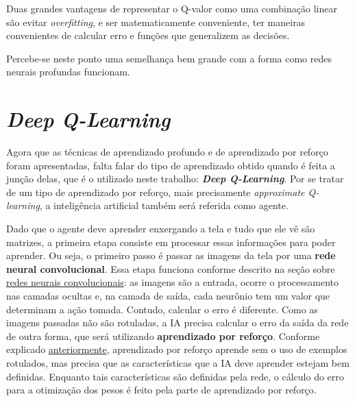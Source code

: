 Duas grandes vantagens de representar o Q-valor como uma combinação linear são evitar \textit{overfitting}, e ser matematicamente conveniente, ter maneiras convenientes de calcular erro e funções que generalizem as decisões.

Percebe-se neste ponto uma semelhança bem grande com a forma como redes neurais profundas funcionam.


\section{\textit{Deep Q-Learning}}
\label{sec:dql}

Agora que as técnicas de aprendizado profundo e de aprendizado por reforço foram apresentadas, falta falar do tipo de aprendizado obtido quando é feita a junção delas, que é o utilizado neste trabalho: \textit{\textbf{Deep Q-Learning}}.
Por se tratar de um tipo de aprendizado por reforço, mais precisamente \textit{approximate Q-learning}, a inteligência artificial também será referida como agente.

Dado que o agente deve aprender enxergando a tela e tudo que ele vê são matrizes, a primeira etapa consiste em processar essas informações para poder aprender.
Ou seja, o primeiro passo é passar as imagens da tela por uma \textbf{rede neural convolucional}.
Essa etapa funciona conforme descrito na seção sobre \hyperref[sec:cnn]{redes neurais convolucionais}: as imagens são a entrada, ocorre o processamento nas camadas ocultas e, na camada de saída, cada neurônio tem um valor que determinam a ação tomada.
Contudo, calcular o erro é diferente.
Como as imagens passadas não são rotuladas, a IA precisa calcular o erro da saída da rede de outra forma, que será utilizando \textbf{aprendizado por reforço}.
Conforme explicado \hyperref[sec:rl]{anteriormente}, aprendizado por reforço aprende sem o uso de exemplos rotulados, mas precisa que as características que a IA deve aprender estejam bem definidas.
Enquanto tais características são definidas pela rede, o cálculo do erro para a otimização dos pesos é feito pela parte de aprendizado por reforço.

